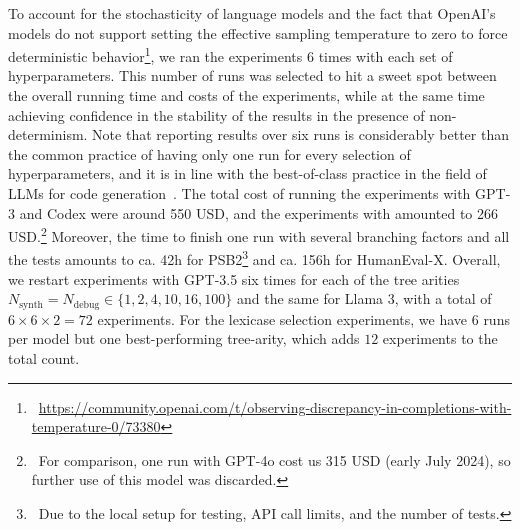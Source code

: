 To account for the stochasticity of language models and the fact that OpenAI's models do not support setting the effective sampling temperature to zero to force deterministic behavior\footnote{~\url{https://community.openai.com/t/observing-discrepancy-in-completions-with-temperature-0/73380}}, we ran the experiments 6 times with each set of hyperparameters.
This number of runs was selected to hit a sweet spot between the overall running time and costs of the experiments, while at the same time achieving confidence in the stability of the results in the presence of non-determinism. 
Note that reporting results over six runs is considerably better than the common practice of having only one run for every selection of hyperparameters, and it is in line with the best-of-class practice in the field of LLMs for code generation~\cite{ouyang2023:llm}.
The total cost of running the experiments with GPT-3 and Codex were around 550 USD, and the experiments with \gpt{} amounted to 266 USD.\footnote{~For comparison, one run with GPT-4o cost us 315 USD (early July 2024), so further use of this model was discarded.}
Moreover, the time to finish one run with several branching factors and all the tests amounts to ca. 42h for PSB2\footnote{~Due to the local setup for testing, API call limits, and the number of tests.} and ca. 156h for HumanEval-X.
Overall, we restart experiments with GPT-3.5 six times for each of the tree arities $ N_{\text{synth}} = N_{\text{debug}} \in \{1,2, 4,10,16,100\}$ and the same for Llama 3, with a total of $6 \times 6 \times 2 = 72$ experiments. 
For the lexicase selection experiments, we have 6 runs per model but one best-performing tree-arity, which adds $12$ experiments to the total count.

